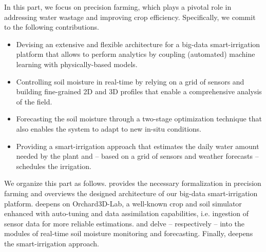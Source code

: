 In this part, we focus on precision farming, which plays a pivotal role in addressing water wastage and improving crop efficiency. Specifically, we commit to the following contributions.
\begin{itemize}
    \item Devising an extensive and flexible architecture for a big-data smart-irrigation platform that allows to perform analytics by coupling (automated) machine learning with physically-based models.
    \item Controlling soil moisture in real-time by relying on a grid of sensors and building fine-grained 2D and 3D profiles that enable a comprehensive analysis of the field.
    \item Forecasting the soil moisture through a two-stage optimization technique that also enables the system to adapt to new in-situ conditions.
    \item Providing a smart-irrigation approach that estimates the daily water amount needed by the plant and -- based on a grid of sensors and weather forecasts -- schedules the irrigation.
\end{itemize}



We organize this part as follows.  provides the necessary formalization in precision farming and overviews the designed architecture of our big-data smart-irrigation platform.
 deepens on Orchard3D-Lab, a well-known crop and soil simulator enhanced with auto-tuning and data assimilation capabilities, i.e. ingestion of sensor data for more reliable estimations.
 and  delve -- respectively -- into the modules of real-time soil moisture monitoring and forecasting.
Finally,  deepens the smart-irrigation approach.